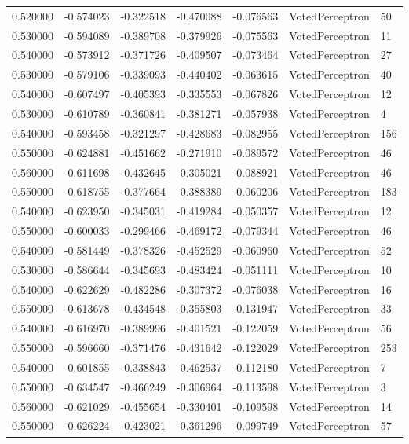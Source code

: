 \begin{tabular}{rrrrrll}
0.520000 & -0.574023 & -0.322518 & -0.470088 & -0.076563 & VotedPerceptron & 50 \\
0.530000 & -0.594089 & -0.389708 & -0.379926 & -0.075563 & VotedPerceptron & 11 \\
0.540000 & -0.573912 & -0.371726 & -0.409507 & -0.073464 & VotedPerceptron & 27 \\
0.530000 & -0.579106 & -0.339093 & -0.440402 & -0.063615 & VotedPerceptron & 40 \\
0.540000 & -0.607497 & -0.405393 & -0.335553 & -0.067826 & VotedPerceptron & 12 \\
0.530000 & -0.610789 & -0.360841 & -0.381271 & -0.057938 & VotedPerceptron & 4 \\
0.540000 & -0.593458 & -0.321297 & -0.428683 & -0.082955 & VotedPerceptron & 156 \\
0.550000 & -0.624881 & -0.451662 & -0.271910 & -0.089572 & VotedPerceptron & 46 \\
0.560000 & -0.611698 & -0.432645 & -0.305021 & -0.088921 & VotedPerceptron & 46 \\
0.550000 & -0.618755 & -0.377664 & -0.388389 & -0.060206 & VotedPerceptron & 183 \\
0.540000 & -0.623950 & -0.345031 & -0.419284 & -0.050357 & VotedPerceptron & 12 \\
0.550000 & -0.600033 & -0.299466 & -0.469172 & -0.079344 & VotedPerceptron & 46 \\
0.540000 & -0.581449 & -0.378326 & -0.452529 & -0.060960 & VotedPerceptron & 52 \\
0.530000 & -0.586644 & -0.345693 & -0.483424 & -0.051111 & VotedPerceptron & 10 \\
0.540000 & -0.622629 & -0.482286 & -0.307372 & -0.076038 & VotedPerceptron & 16 \\
0.550000 & -0.613678 & -0.434548 & -0.355803 & -0.131947 & VotedPerceptron & 33 \\
0.540000 & -0.616970 & -0.389996 & -0.401521 & -0.122059 & VotedPerceptron & 56 \\
0.550000 & -0.596660 & -0.371476 & -0.431642 & -0.122029 & VotedPerceptron & 253 \\
0.540000 & -0.601855 & -0.338843 & -0.462537 & -0.112180 & VotedPerceptron & 7 \\
0.550000 & -0.634547 & -0.466249 & -0.306964 & -0.113598 & VotedPerceptron & 3 \\
0.560000 & -0.621029 & -0.455654 & -0.330401 & -0.109598 & VotedPerceptron & 14 \\
0.550000 & -0.626224 & -0.423021 & -0.361296 & -0.099749 & VotedPerceptron & 57 \\

\end{tabular}
